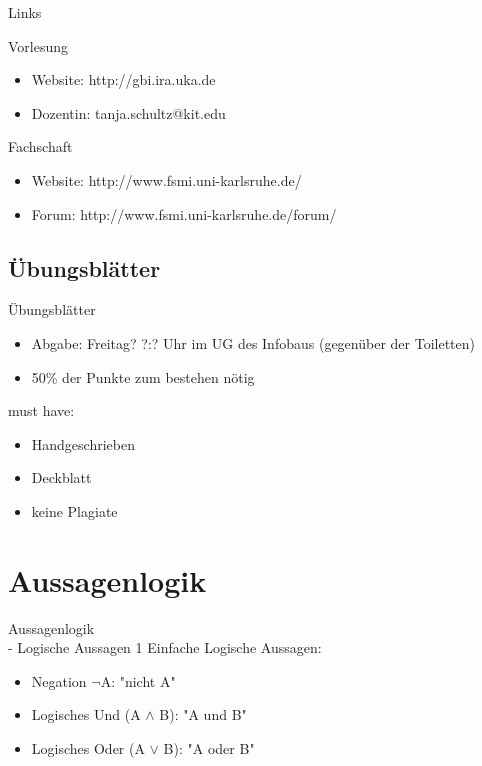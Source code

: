 \documentclass[18pt]{beamer}
\begin{document}
\begin{frame}{Links}
\begin{block}{Vorlesung}
\begin{itemize}
\item Website: http://gbi.ira.uka.de
\item Dozentin: tanja.schultz@kit.edu
\end{itemize}
\end{block}

\begin{block}{Fachschaft}
\begin{itemize}
\item Website: http://www.fsmi.uni-karlsruhe.de/
\item Forum: http://www.fsmi.uni-karlsruhe.de/forum/
\end{itemize}
\end{block}
\end{frame}


\subsection{\"Ubungsbl\"atter}
\begin{frame}{\"Ubungsbl\"atter}
\begin{itemize}
\item Abgabe: Freitag? ?:? Uhr im UG des Infobaus (gegen\"uber der Toiletten)
\item 50\% der Punkte zum bestehen n\"otig
\end{itemize}

\begin{exampleblock}{must have:}
\begin{itemize}
\item Handgeschrieben
\item Deckblatt
\item keine Plagiate
\end{itemize}
\end{exampleblock}
\end{frame}


\section{Aussagenlogik}
\begin{frame}{Aussagenlogik\\ - Logische Aussagen 1}
Einfache Logische Aussagen:
\begin{itemize}
\item Negation $\neg$A: "nicht A"
\pause
\item Logisches Und (A $\land$ B): "A und B"
\pause
\item Logisches Oder (A $\lor$ B): "A oder B"
\end{itemize}
\end{frame}
\end{document}
